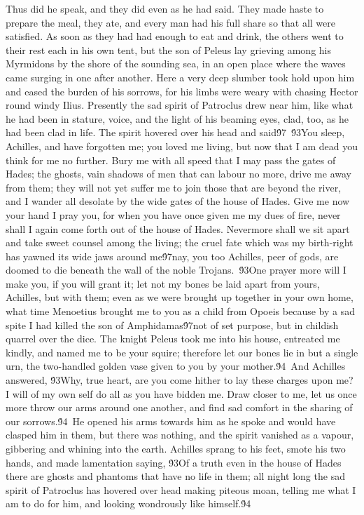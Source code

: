 {Thus did he speak, and they did even as he had said. They made haste to prepare the meal, they ate, and every man had his full share so that all were satisfied. As soon as they had had enough to eat and drink, the others went to their rest each in his own tent, but the son of Peleus lay grieving among his Myrmidons by the shore of the sounding sea, in an open place where the waves came surging in one after another. Here a very deep slumber took hold upon him and eased the burden of his sorrows, for his limbs were weary with chasing Hector round windy Ilius. Presently the sad spirit of Patroclus drew near him, like what he had been in stature, voice, and the light of his beaming eyes, clad, too, as he had been clad in life. The spirit hovered over his head and said\'97\
\'93You sleep, Achilles, and have forgotten me; you loved me living, but now that I am dead you think for me no further. Bury me with all speed that I may pass the gates of Hades; the ghosts, vain shadows of men that can labour no more, drive me away from them; they will not yet suffer me to join those that are beyond the river, and I wander all desolate by the wide gates of the house of Hades. Give me now your hand I pray you, for when you have once given me my dues of fire, never shall I again come forth out of the house of Hades. Nevermore shall we sit apart and take sweet counsel among the living; the cruel fate which was my birth-right has yawned its wide jaws around me\'97nay, you too Achilles, peer of gods, are doomed to die beneath the wall of the noble Trojans.\
\'93One prayer more will I make you, if you will grant it; let not my bones be laid apart from yours, Achilles, but with them; even as we were brought up together in your own home, what time Menoetius brought me to you as a child from Opoeis because by a sad spite I had killed the son of Amphidamas\'97not of set purpose, but in childish quarrel over the dice. The knight Peleus took me into his house, entreated me kindly, and named me to be your squire; therefore let our bones lie in but a single urn, the two-handled golden vase given to you by your mother.\'94\
And Achilles answered, \'93Why, true heart, are you come hither to lay these charges upon me? I will of my own self do all as you have bidden me. Draw closer to me, let us once more throw our arms around one another, and find sad comfort in the sharing of our sorrows.\'94\
He opened his arms towards him as he spoke and would have clasped him in them, but there was nothing, and the spirit vanished as a vapour, gibbering and whining into the earth. Achilles sprang to his feet, smote his two hands, and made lamentation saying, \'93Of a truth even in the house of Hades there are ghosts and phantoms that have no life in them; all night long the sad spirit of Patroclus has hovered over head making piteous moan, telling me what I am to do for him, and looking wondrously like himself.\'94\
}
